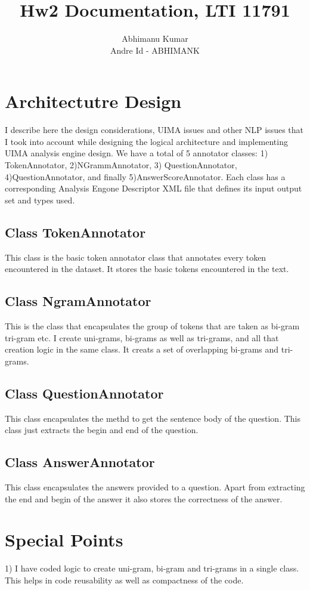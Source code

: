 \documentclass{article}
\title{Hw2 Documentation, LTI 11791}
\author{Abhimanu Kumar \\ Andre Id - ABHIMANK}
\date
\begin{document}
\maketitle

\section{Architectutre Design}
I describe here the design considerations, UIMA issues and other 
NLP issues that I took into account while designing the logical architecture 
and implementing UIMA analysis engine design.
We have a total of 5 annotator classes: 1) TokenAnnotator, 2)NGrammAnnotator,
3) QuestionAnnotator, 4)QuestionAnnotator, and finally 5)AnswerScoreAnnotator.
Each class has a corresponding Analysis Engone Descriptor XML file that
defines its input output set and types used.

\subsection{Class TokenAnnotator}
This class is the basic token annotator class that annotates every token 
encountered in the dataset. It stores the basic tokens encountered in the text. 

\subsection{Class NgramAnnotator}
This is the class that encapsulates the group of tokens that are taken as 
bi-gram tri-gram etc. I create uni-grams, bi-grams as well as tri-grams, and 
all that creation logic in the same class. It creats a set of overlapping
bi-grams and tri-grams.


\subsection{Class QuestionAnnotator}
This class encapsulates the methd to get the sentence body of the question. 
This class just extracts the begin and end of the question.
 
\subsection{Class AnswerAnnotator}
This class encapsulates the answers provided to a question. Apart from
extracting the end and begin of the answer it also stores the correctness of the
answer.

\section{Special Points}
1) I have coded logic to create uni-gram, bi-gram and tri-grams in a single
class. This helps in code reusability as well as compactness of the code.
\end{document}

